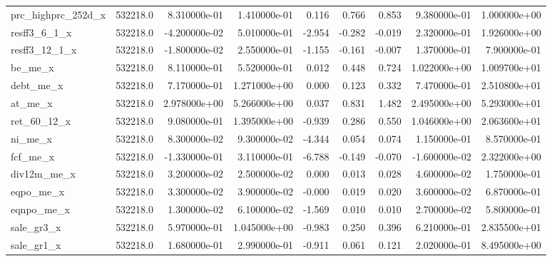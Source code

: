 \documentclass[12pt]{article}
\begin{document}
\begin{landscape}
\begin{longtable}{|l|r|r|r|r|r|r|r|r|}
prc\_highprc\_252d\_x     &  532218.0 &  8.310000e-01 &  1.410000e-01 &       0.116 &        0.766 &        0.853 &  9.380000e-01 &  1.000000e+00 \\
resff3\_6\_1\_x           &  532218.0 & -4.200000e-02 &  5.010000e-01 &      -2.954 &       -0.282 &       -0.019 &  2.320000e-01 &  1.926000e+00 \\
resff3\_12\_1\_x          &  532218.0 & -1.800000e-02 &  2.550000e-01 &      -1.155 &       -0.161 &       -0.007 &  1.370000e-01 &  7.900000e-01 \\
be\_me\_x                &  532218.0 &  8.110000e-01 &  5.520000e-01 &       0.012 &        0.448 &        0.724 &  1.022000e+00 &  1.009700e+01 \\
debt\_me\_x              &  532218.0 &  7.170000e-01 &  1.271000e+00 &       0.000 &        0.123 &        0.332 &  7.470000e-01 &  2.510800e+01 \\
at\_me\_x                &  532218.0 &  2.978000e+00 &  5.266000e+00 &       0.037 &        0.831 &        1.482 &  2.495000e+00 &  5.293000e+01 \\
ret\_60\_12\_x            &  532218.0 &  9.080000e-01 &  1.395000e+00 &      -0.939 &        0.286 &        0.550 &  1.046000e+00 &  2.063600e+01 \\
ni\_me\_x                &  532218.0 &  8.300000e-02 &  9.300000e-02 &      -4.344 &        0.054 &        0.074 &  1.150000e-01 &  8.570000e-01 \\
fcf\_me\_x               &  532218.0 & -1.330000e-01 &  3.110000e-01 &      -6.788 &       -0.149 &       -0.070 & -1.600000e-02 &  2.322000e+00 \\
div12m\_me\_x            &  532218.0 &  3.200000e-02 &  2.500000e-02 &       0.000 &        0.013 &        0.028 &  4.600000e-02 &  1.750000e-01 \\
eqpo\_me\_x              &  532218.0 &  3.300000e-02 &  3.900000e-02 &      -0.000 &        0.019 &        0.020 &  3.600000e-02 &  6.870000e-01 \\
eqnpo\_me\_x             &  532218.0 &  1.300000e-02 &  6.100000e-02 &      -1.569 &        0.010 &        0.010 &  2.700000e-02 &  5.800000e-01 \\
sale\_gr3\_x             &  532218.0 &  5.970000e-01 &  1.045000e+00 &      -0.983 &        0.250 &        0.396 &  6.210000e-01 &  2.835500e+01 \\
sale\_gr1\_x             &  532218.0 &  1.680000e-01 &  2.990000e-01 &      -0.911 &        0.061 &        0.121 &  2.020000e-01 &  8.495000e+00 \\

\end{longtable}
\end{landscape}
\end{document}
